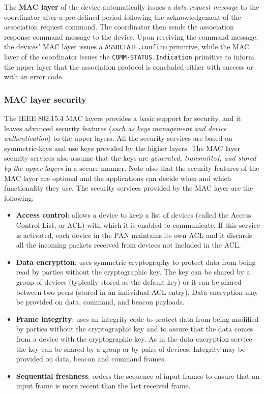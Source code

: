 \documentclass[10pt,a4paper]{report}
\theoremstyle{definition}
\begin{document}
The \textbf{MAC layer} of the device automatically issues a \textit{data request message} to the coordinator after a pre-defined period following the acknowledgement of the association request command. The coordinator then sends the association response command message to the device.
Upon receiving the command message, the devices’ MAC layer issues a \texttt{ASSOCIATE.confirm} primitive, while the MAC layer of the coordinator issues the \texttt{COMM-STATUS.Indication} primitive to inform the upper layer that the association protocol is concluded either with success or with an error code.
\subsubsection{MAC layer security}\label{sec:mac-layer-security}
The IEEE 802.15.4 MAC layers provides a basic support for security, and it leaves advanced security features (\textit{such as keys management and device authentication}) to the upper layers. All the security services are based on symmetric-keys and use keys provided by the higher layers.
The MAC layer security services also assume that the keys are \textit{generated, transmitted, and stored by the upper layers} in a secure manner. Note also that the security features of the MAC layer are optional and the applications can decide when and which functionality they use. The security services provided by the MAC layer are the following:
\begin{itemize}
	\item 
	\textbf{Access control}: allows a device to keep a list of devices (called the Access Control List, or ACL) with which it is enabled to communicate. If this service is activated, each device in the PAN maintains its own ACL and it discards all the incoming packets received from devices not included in the ACL.
	\item 
	\textbf{Data encryption}: uses symmetric cryptography to protect data from being read by parties without the cryptographic key. The key can be shared by a group of devices (typically stored as the default key) or it can be shared between two peers (stored in an individual ACL entry). Data encryption may be provided on data, command, and beacon payloads.
	\item 
	\textbf{Frame integrity}: uses an integrity code to protect data from being modified by parties without the cryptographic key and to assure that the data comes from a device with the cryptographic key. As in the data encryption service the key can be shared by a group or by pairs of devices. Integrity may be provided on data, beacon and command frames.
	\item 
	\textbf{Sequential freshness}: orders the sequence of input frames to ensure that an input frame is more recent than the last received frame.
\end{itemize}
\end{document}
